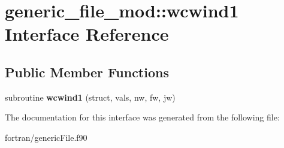 \hypertarget{interfacegeneric__file__mod_1_1wcwind1}{}\section{generic\+\_\+file\+\_\+mod\+:\+:wcwind1 Interface Reference}
\label{interfacegeneric__file__mod_1_1wcwind1}
\subsection*{Public Member Functions}
\begin{DoxyCompactItemize}
\item 
\mbox{\label{interfacegeneric__file__mod_1_1wcwind1_a8f4d56be7c62b0bb74efb75502cc76e4}} 
subroutine {\bfseries wcwind1} (struct, vals, nw, fw, jw)
\end{DoxyCompactItemize}


The documentation for this interface was generated from the following file\+:\begin{DoxyCompactItemize}
\item 
fortran/generic\+File.\+f90\end{DoxyCompactItemize}

